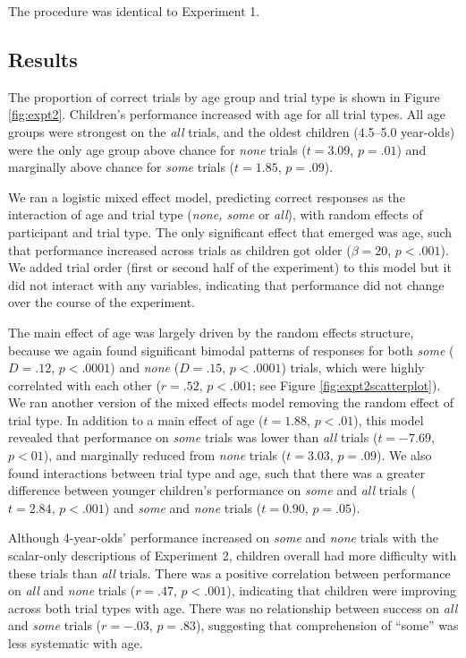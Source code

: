 \documentclass[10pt,letterpaper]{article}
\begin{document}
The procedure was identical to Experiment 1. 

\subsection{Results}

The proportion of correct trials by age group and trial type is shown in Figure \ref{fig:expt2}.  Children's performance increased with age for all trial types. All age groups were strongest on the \emph{all} trials, and the oldest children (4.5--5.0 year-olds) were the only age group above chance for \emph{none} trials ($t = 3.09$, $p=.01$) and marginally above chance for \emph{some} trials ($t=1.85$, $p=.09$). 

We ran a logistic mixed effect model, predicting correct responses as the interaction of age and trial type (\emph{none, some} or \emph{all}), with random effects of participant and trial type. The only significant effect that emerged was age, such that performance increased across trials as children got older ($\beta = 20$, $p <.001$). We added trial order (first or second half of the experiment) to this model but it did not interact with any variables, indicating that performance did not change over the course of the experiment.

The main effect of age was largely driven by the random effects structure, because we again found significant bimodal patterns of responses for both \emph{some} ($D=.12$, $p<.0001$) and \emph{none} ($D=.15$, $p<.0001$) trials, which were highly correlated with each other ($r=.52$, $p<.001$; see Figure \ref{fig:expt2scatterplot}). We ran another version of the mixed effects model removing the random effect of trial type. In addition to a main effect of age ($t = 1.88$, $p<.01$), this model revealed that performance on \emph{some} trials was lower than \emph{all} trials ($t = -7.69$, $p<01$), and marginally reduced from \emph{none} trials ($t = 3.03$, $p=.09$). We also found interactions between trial type and age, such that there was a greater difference between younger children's performance on \emph{some} and \emph{all} trials ($t=2.84$, $p<.001$) and \emph{some} and \emph{none} trials ($t=0.90$, $p=.05$).

Although 4-year-olds' performance increased on \emph{some} and \emph{none} trials with the scalar-only descriptions of Experiment 2, children overall had more difficulty with these trials than \emph{all} trials. There was a positive correlation between performance on \emph{all} and \emph{none} trials ($r=.47$, $p<.001$), indicating that children were  improving across both trial types with age.  There was no relationship between success on \emph{all} and \emph{some} trials ($r=-.03$, $p=.83$), suggesting that comprehension of ``some'' was less systematic with age. 
\end{document}
